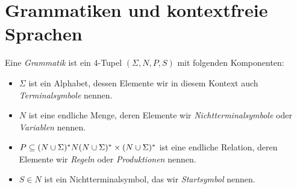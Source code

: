 \section{Grammatiken und kontextfreie Sprachen}
\begin{Def}
	Eine \emph{Grammatik} ist ein 4-Tupel $(\Sigma,N,P,S)$ mit folgenden Komponenten:
	\begin{itemize}
	\item $\Sigma$ ist ein Alphabet, dessen Elemente wir in diesem Kontext auch \emph{Terminalsymbole} nennen.
	\item $N$ ist eine endliche Menge, deren Elemente wir \emph{Nichtterminalsymbole} oder \emph{Variablen} nennen.
	\item $P\subseteq (N\cup\Sigma)^*N(N\cup\Sigma)^* \times (N\cup\Sigma)^*$ ist eine endliche Relation, 
	deren Elemente wir \emph{Regeln} oder \emph{Produktionen} nennen.
	\item $S\in N$ ist ein Nichtterminalsymbol, das wir \emph{Startsymbol} nennen.
	\qedhere
	\end{itemize}
\end{Def}

